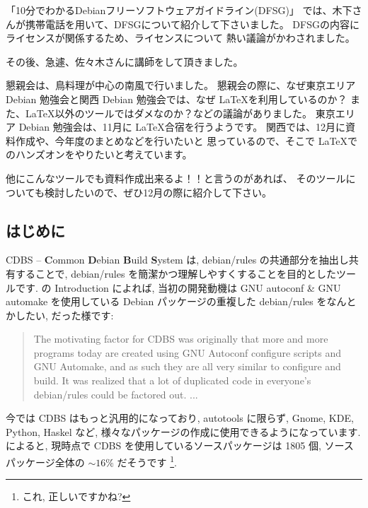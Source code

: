 \documentclass[mingoth,a4paper]{jsarticle}
\begin{document}
「10分でわかるDebianフリーソフトウェアガイドライン(DFSG)」
では、木下さんが携帯電話を用いて、DFSGについて紹介して下さいました。
DFSGの内容にライセンスが関係するため、ライセンスについて
熱い議論がかわされました。

その後、急遽、佐々木さんに講師をして頂きました。

懇親会は、鳥料理が中心の南風で行いました。
懇親会の際に、なぜ東京エリア Debian 勉強会と関西 Debian 勉強会では、なぜ
\LaTeX を利用しているのか？
また、\LaTeX 以外のツールではダメなのか？などの議論がありました。
東京エリア Debian 勉強会は、11月に \LaTeX 合宿を行うようです。
関西では、12月に資料作成や、今年度のまとめなどを行いたいと
思っているので、そこで \LaTeX でのハンズオンをやりたいと考えています。

他にこんなツールでも資料作成出来るよ！！と言うのがあれば、
そのツールについても検討したいので、ぜひ12月の際に紹介して下さい。

\def\thefigure{\thesection.\arabic{figure}}
\def\thetable{\thesection.\arabic{table}}
\setcounter{figure}{0}
\setcounter{table}{0}

\subsection{はじめに}

CDBS -- {\bf C}ommon {\bf D}ebian {\bf B}uild {\bf S}ystem は,
debian/rules の共通部分を抽出し共有することで, 
debian/rules を簡潔かつ理解しやすくすることを目的としたツールです.
%
\cite{lenny CDBS doc} の Introduction によれば, 当初の開発動機は GNU
autoconf \& GNU automake を使用している Debian パッケージの重複した
debian/rules をなんとかしたい, だった様です:
\begin{quotation}
    The motivating factor for CDBS was originally that more and more
    programs today are created using GNU Autoconf configure scripts and
    GNU Automake, and as such they are all very similar to configure and
    build.  It was realized that a lot of duplicated code in everyone's
    debian/rules could be factored out. ...
\end{quotation}

今では CDBS はもっと汎用的になっており, 
autotools に限らず, Gnome, KDE, Python, Haskel など, 
様々なパッケージの作成に使用できるようになっています.
%
\cite{CDBS ギャラリ}によると, 
現時点で CDBS を使用しているソースパッケージは 1805 個, 
ソースパッケージ全体の $\sim 16 \%$ だそうです
\footnote{これ, 正しいですかね? }.
\end{document}
